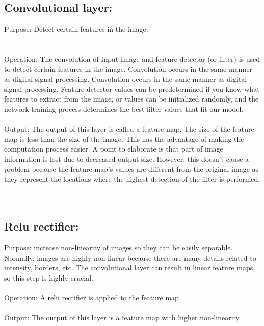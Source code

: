 \documentclass[12pt,letterpaper, onecolumn]{exam}
\begin{document}
    \subsection{Convolutional layer:}
    Purpose: Detect certain features in the image.\\\\\\

  Operation: The convolution of Input Image and feature detector (or filter) is used to detect certain features in the image. Convolution occurs in the same manner as digital      signal processing. Convolution occurs in the same manner as digital signal processing. Feature detector values can be predetermined if you know what features to extract from   the image, or values can be initialized randomly, and the network training process determines the best filter values that fit our model.
\\\\
  Output: The output of this layer is called a feature map. The size of the feature map is less than the size of the image. This has the advantage of making the computation        process easier. A point to elaborate is that part of image information is lost due to decreased output size. However, this doesn’t cause a problem because the feature map’s      values are different from the original image as they represent the locations where the highest detection of the filter is performed.\\\\\\
    
    \subsection{Relu rectifier:}
    Purpose: increase non-linearity of images so they can be easily separable. Normally, images are highly non-linear because there are many details related to intensity, borders,   etc. The convolutional layer can result in linear feature maps, so this step is highly crucial.\\\\

  Operation: A relu rectifier is applied to the feature map
\\\\
  Output: The output of this layer is a feature map with higher non-linearity.
  \\\\\\
  
\end{document}
